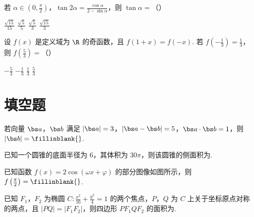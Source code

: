 \begin{problem}
若 \(\alpha\in\left(0,\frac{\pi}{2}\right)\)，\(\tan 2\alpha=\frac{\cos\alpha}{2-\sin\alpha}\)，则 \(\tan\alpha=\)（\quad）

\choices
    {\(\frac{\sqrt{15}}{15}\)}
    {\(\frac{\sqrt{5}}{5}\)}
    {\(\frac{\sqrt{5}}{3}\)}
    {\(\frac{\sqrt{15}}{3}\)}

\end{problem}

\begin{problem}
设 \(f(x)\) 是定义域为 \(\R\) 的奇函数，且 \(f(1+x)=f(-x)\). 若 \(f\left(-\frac{1}{3}\right)=\frac{1}{3}\)，则 \(f\left(\frac{5}{3}\right)=\)（\quad）

\choices
    {\(-\frac{5}{3}\)}
    {\(-\frac{1}{3}\)}
    {\(\frac{1}{3}\)}
    {\(\frac{5}{3}\)}

\end{problem}

\section{填空题}

\begin{problem}
若向量 \(\bs a\)，\(\bs b\) 满足 \(|\bs a|=3\)，\(|\bs a-\bs b|=5\)，\(\bs a\cdot\bs b=1\)，则 \(|\bs b|=\fillinblank{}\).

\end{problem}

\begin{problem}
已知一个圆锥的底面半径为 \(6\)，其体积为 \(30\pi\)，则该圆锥的侧面积为\fillinblank{}.

\answer{\(39\pi\)}
\end{problem}

\begin{problem}
已知函数 \(f(x)=2\cos(\omega x+\varphi)\) 的部分图像如图所示，则 \(f\left(\frac{\pi}{2}\right)=\fillinblank{}\).


\end{problem}

\begin{problem}
已知 \(F_1\)，\(F_2\) 为椭圆 \(C:\frac{x^2}{16}+\frac{y^2}{4}=1\) 的两个焦点，\(P\)，\(Q\) 为 \(C\) 上关于坐标原点对称的两点，且 \(|PQ|=|F_1F_2|\)，则四边形 \(PF_1QF_2\) 的面积为\fillinblank{}.

\end{problem}

